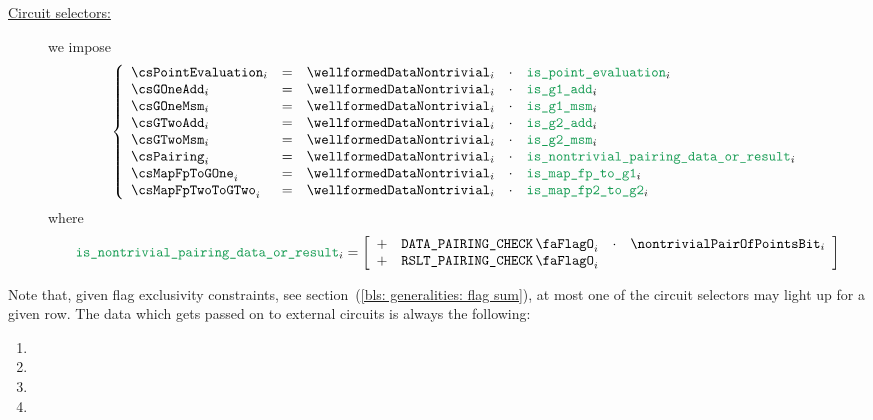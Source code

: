 \begin{description}
    \item[\underline{Circuit selectors:}]
        we impose
        \[
            \left\{ \begin{array}{lcrcl}
                \csPointEvaluation _{i} & = & \wellformedDataNontrivial _{i} & \cdot & \locIsPointEvaluation                    _{i} \\
                \csGOneAdd         _{i} & = & \wellformedDataNontrivial _{i} & \cdot & \locIsBlsGOneAdd                         _{i} \\
                \csGOneMsm         _{i} & = & \wellformedDataNontrivial _{i} & \cdot & \locIsBlsGOneMsm                         _{i} \\
                \csGTwoAdd         _{i} & = & \wellformedDataNontrivial _{i} & \cdot & \locIsBlsGTwoAdd                         _{i} \\
                \csGTwoMsm         _{i} & = & \wellformedDataNontrivial _{i} & \cdot & \locIsBlsGTwoMsm                         _{i} \\
                \csPairing         _{i} & = & \wellformedDataNontrivial _{i} & \cdot & \locIsBlsIsNontrivialPairingDataOrResult _{i} \\
                \csMapFpToGOne     _{i} & = & \wellformedDataNontrivial _{i} & \cdot & \locIsBlsMapFpToGOne                     _{i} \\
                \csMapFpTwoToGTwo  _{i} & = & \wellformedDataNontrivial _{i} & \cdot & \locIsBlsMapFpTwoToGTwo                  _{i} \\
            \end{array} \right.
        \]
        where
        \[
            \locIsBlsIsNontrivialPairingDataOrResult _{i}
            =
            \left[ \begin{array}{crcl}
                + & \isBlsPairingCheckData   _{i} & \cdot & \nontrivialPairOfPointsBit _{i} \\
                + & \isBlsPairingCheckResult _{i} \\
            \end{array} \right]
        \]
\end{description}
Note that, given flag exclusivity constraints,
see section~(\ref{bls: generalities: flag sum}),
at most one of the circuit selectors may light up for a given row.
The data which gets passed on to external circuits is always the following:
\begin{enumerate}
    \item \blsId{}
    \item \blsIndex{}
    \item \blsLimb{}
    \item \blsSuccessBit{}
\end{enumerate}
